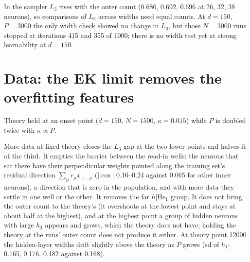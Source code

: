 \documentclass[11pt,a4paper]{article}
\begin{document}
In the sampler $L_3$ rises with the outer count (0.686, 0.692, 0.696 at 26, 32, 38 neurons), so comparisons of $L_3$
across widths need equal counts. At $d=150$, $P=3000$ the only width check showed no change in $L_3$, but those
$N=3000$ runs stopped at iterations 415 and 355 of 1000; there is no width test yet at strong learnability at $d=150$.

\section*{Data: the EK limit removes the overfitting features}

Theory held at an onset point ($d=150$, $N=1500$, $\kappa=0.015$) while $P$ is doubled twice with $\kappa\propto P$.
\begin{center}
\end{center}
More data at fixed theory closes the $L_3$ gap at the two lower points and halves it at the third. It empties the
barrier between the read-in wells: the neurons that sat there have their perpendicular weights pointed along the
training set's residual direction $\sum_\mu r_\mu x_{\perp,\mu}$ ($|\cos|$ 0.16--0.24 against 0.065 for other inner neurons),
a direction that is zero in the population, and with more data they settle in one well or the other. It removes the
far $h|\mathrm{He}_1$ group. It does not bring the outer count to the theory's (it overshoots at the lowest point and
stays at about half at the highest), and at the highest point a group of hidden neurons with large $h_3$ appears and
grows, which the theory does not have; holding the theory at the runs' outer count does not produce it either. At theory
point 12000 the hidden-layer widths drift slightly above the theory as $P$ grows (sd of $h_1$: 0.165, 0.176, 0.182
against 0.168).
\end{document}
